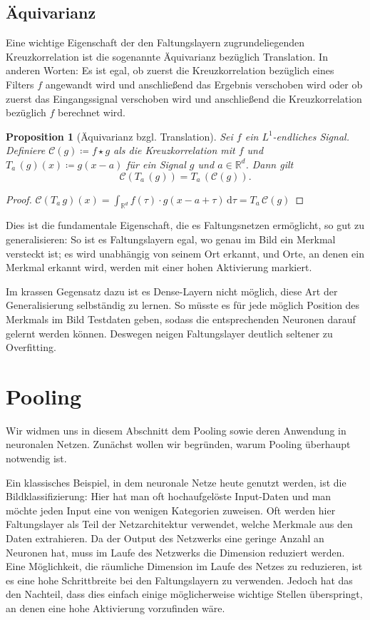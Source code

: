 \documentclass[paper=a4, 	%
		fontsize=11pt,
		abstract=true, 	%
		headsepline, 	%
		notitlepage	%
		]{scrartcl}
\newtheorem{proposition}[theorem]{Proposition}
\theoremstyle{definition}
\newcommand{\R}{\mathbb{R}}
\newcommand{\diff}{\,\textrm{d}}
\newcommand{\transl}[2]{T_{#1}\, #2}
\begin{document}
\subsection{Äquivarianz}
    
Eine wichtige Eigenschaft der den Faltungslayern zugrundeliegenden Kreuzkorrelation ist die sogenannte Äquivarianz bezüglich Translation.
In anderen Worten: Es ist egal, ob zuerst die Kreuzkorrelation bezüglich eines Filters $f$ angewandt wird und anschließend das Ergebnis verschoben wird oder ob zuerst das Eingangssignal verschoben wird und anschließend die Kreuzkorrelation bezüglich $f$ berechnet wird.

\begin{proposition}[Äquivarianz bzgl. Translation]
    Sei $f$ ein $L^1$-endliches Signal.
    Definiere $\mathcal{C}(g)\coloneqq f\star g$ als die Kreuzkorrelation mit $f$ und $\transl{a}{(g)}(x) \coloneqq g(x - a)$ für ein Signal $g$ und $a\in\R^d$.
    Dann gilt \[ \mathcal{C}(\transl{a}{(g)}) = \transl{a}{(\mathcal{C}(g))}. \]
\end{proposition}
\begin{proof}
    $\mathcal{C}(T_a\, g)(x) = \int_{\R^d} f(\tau) \cdot g(x - a + \tau) \diff \tau = \transl{a}{\mathcal{C}(g)}$
\end{proof}

Dies ist die fundamentale Eigenschaft, die es Faltungsnetzen ermöglicht, so gut zu generalisieren:
So ist es Faltungslayern egal, wo genau im Bild ein Merkmal versteckt ist; es wird unabhängig von seinem Ort erkannt, und Orte, an denen ein Merkmal erkannt wird, werden mit einer hohen Aktivierung markiert.

Im krassen Gegensatz dazu ist es Dense-Layern nicht möglich, diese Art der Generalisierung selbständig zu lernen.
So müsste es für jede möglich Position des Merkmals im Bild Testdaten geben, sodass die entsprechenden Neuronen darauf gelernt werden können.
Deswegen neigen Faltungslayer deutlich seltener zu Overfitting. 

\section{Pooling}

Wir widmen uns in diesem Abschnitt dem Pooling sowie deren Anwendung in neuronalen Netzen.
Zunächst wollen wir begründen, warum Pooling überhaupt notwendig ist.

Ein klassisches Beispiel, in dem neuronale Netze heute genutzt werden, ist die Bildklassifizierung:
Hier hat man oft hochaufgelöste Input-Daten und man möchte jeden Input eine von wenigen Kategorien zuweisen.
Oft werden hier Faltungslayer als Teil der Netzarchitektur verwendet, welche Merkmale aus den Daten extrahieren.
Da der Output des Netzwerks eine geringe Anzahl an Neuronen hat, muss im Laufe des Netzwerks die Dimension reduziert werden.
Eine Möglichkeit, die räumliche Dimension im Laufe des Netzes zu reduzieren, ist es eine hohe Schrittbreite bei den Faltungslayern zu verwenden.
Jedoch hat das den Nachteil, dass dies einfach einige möglicherweise wichtige Stellen überspringt, an denen eine hohe Aktivierung vorzufinden wäre.
\end{document}
